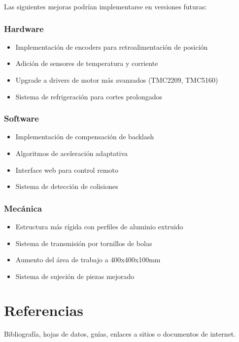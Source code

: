\documentclass[12pt]{article}
\begin{document}
Las siguientes mejoras podrían implementarse en versiones futuras:

\subsubsection{Hardware}
\begin{itemize}
    \item Implementación de encoders para retroalimentación de posición
    \item Adición de sensores de temperatura y corriente
    \item Upgrade a drivers de motor más avanzados (TMC2209, TMC5160)
    \item Sistema de refrigeración para cortes prolongados
\end{itemize}

\subsubsection{Software}
\begin{itemize}
    \item Implementación de compensación de backlash
    \item Algoritmos de aceleración adaptativa
    \item Interface web para control remoto
    \item Sistema de detección de colisiones
\end{itemize}

\subsubsection{Mecánica}
\begin{itemize}
    \item Estructura más rígida con perfiles de aluminio extruido
    \item Sistema de transmisión por tornillos de bolas
    \item Aumento del área de trabajo a 400x400x100mm
    \item Sistema de sujeción de piezas mejorado
\end{itemize}

\section{Referencias}
Bibliografía, hojas de datos, guías, enlaces a sitios o documentos de internet.
\end{document}
